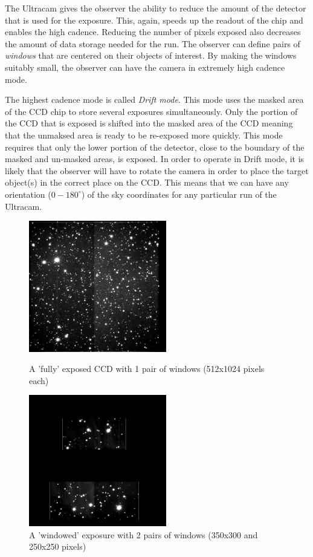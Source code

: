 \documentclass[a4paper,10pt]{article}
\begin{document}
The Ultracam gives the observer the ability to reduce the amount of the detector that is used for the exposure. This, again, speeds up the readout of the chip and enables the high cadence. Reducing the number of pixels exposed also decreases the amount of data storage needed for the run. The observer can define pairs of \emph{windows} that are centered on their objects of interest. By making the windows suitably small, the observer can have the camera in extremely high cadence mode. 

The highest cadence mode is called \emph{Drift mode}. This mode uses the masked area of the CCD chip to store several exposures simultaneously. Only the portion of the CCD that is exposed is shifted into the masked area of the CCD meaning that the unmaksed area is ready to be re-exposed more quickly. This mode requires that only the lower portion of the detector, close to the boundary of the masked and un-masked areas, is exposed. In order to operate in Drift mode, it is likely that the observer will have to rotate the camera in order to place the target object(s) in the correct place on the CCD. This means that we can have any orientation ($0-180^{\circ}$) of the sky coordinates for any particular run of the Ultracam.   

\begin{figure}
\centering
\begin{minipage}{.5\textwidth}
  \centering
  \includegraphics[width=60mm]{images/run010_r.png}
  \caption{A 'fully' exposed CCD with 1 pair of windows (512x1024 pixels each)}
  \label{fig:KOI-824}
\end{minipage}%
\begin{minipage}{.5\textwidth}
  \centering
  \includegraphics[width=60mm]{images/run016_r.png}
  \caption{A 'windowed' exposure with 2 pairs of windows (350x300 and 250x250 pixels)}
  \label{fig:V713Cep}
\end{minipage}
\end{figure}
\end{document}
